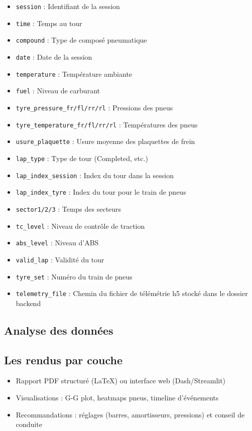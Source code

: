 \documentclass[a4paper,12pt]{report}
\begin{document}
\begin{itemize}
    \item \texttt{session} : Identifiant de la session
    \item \texttt{time} : Temps au tour
    \item \texttt{compound} : Type de composé pneumatique
    \item \texttt{date} : Date de la session
    \item \texttt{temperature} : Température ambiante
    \item \texttt{fuel} : Niveau de carburant
    \item \texttt{tyre\_pressure\_fr/fl/rr/rl} : Pressions des pneus
    \item \texttt{tyre\_temperature\_fr/fl/rr/rl} : Températures des pneus
    \item \texttt{usure\_plaquette} : Usure moyenne des plaquettes de frein
    \item \texttt{lap\_type} : Type de tour (Completed, etc.)
    \item \texttt{lap\_index\_session} : Index du tour dans la session
    \item \texttt{lap\_index\_tyre} : Index du tour pour le train de pneus
    \item \texttt{sector1/2/3} : Temps des secteurs
    \item \texttt{tc\_level} : Niveau de contrôle de traction
    \item \texttt{abs\_level} : Niveau d'ABS
    \item \texttt{valid\_lap} : Validité du tour
    \item \texttt{tyre\_set} : Numéro du train de pneus
    \item \texttt{telemetry\_file} : Chemin du fichier de télémétrie h5 stocké dans le dossier backend
\end{itemize}

\subsection{Analyse des données}

\subsection{Les rendus par couche}

\begin{itemize}
    \item Rapport PDF structuré (LaTeX) ou interface web (Dash/Streamlit)
    \item Visualisations : G-G plot, heatmaps pneus, timeline d’événements
    \item Recommandations : réglages (barres, amortisseurs, pressions) et conseil de conduite
\end{itemize}
\end{document}
